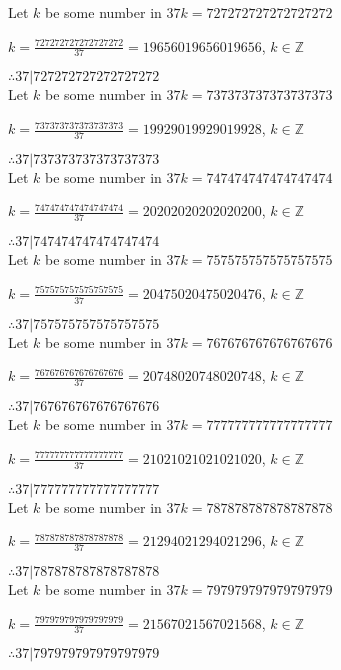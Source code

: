 \documentclass{article}
\begin{document}
Let $k$ be some number in $37k = 727272727272727272$

$k = \frac{727272727272727272}{37} = 19656019656019656$, $k \in \mathbb{Z}$

$ \therefore  37|727272727272727272 $ \\

Let $k$ be some number in $37k = 737373737373737373$

$k = \frac{737373737373737373}{37} = 19929019929019928$, $k \in \mathbb{Z}$

$ \therefore  37|737373737373737373 $ \\

Let $k$ be some number in $37k = 747474747474747474$

$k = \frac{747474747474747474}{37} = 20202020202020200$, $k \in \mathbb{Z}$

$ \therefore  37|747474747474747474 $ \\

Let $k$ be some number in $37k = 757575757575757575$

$k = \frac{757575757575757575}{37} = 20475020475020476$, $k \in \mathbb{Z}$

$ \therefore  37|757575757575757575 $ \\

Let $k$ be some number in $37k = 767676767676767676$

$k = \frac{767676767676767676}{37} = 20748020748020748$, $k \in \mathbb{Z}$

$ \therefore  37|767676767676767676 $ \\

Let $k$ be some number in $37k = 777777777777777777$

$k = \frac{777777777777777777}{37} = 21021021021021020$, $k \in \mathbb{Z}$

$ \therefore  37|777777777777777777 $ \\

Let $k$ be some number in $37k = 787878787878787878$

$k = \frac{787878787878787878}{37} = 21294021294021296$, $k \in \mathbb{Z}$

$ \therefore  37|787878787878787878 $ \\

Let $k$ be some number in $37k = 797979797979797979$

$k = \frac{797979797979797979}{37} = 21567021567021568$, $k \in \mathbb{Z}$

$ \therefore  37|797979797979797979 $ \\
\end{document}
